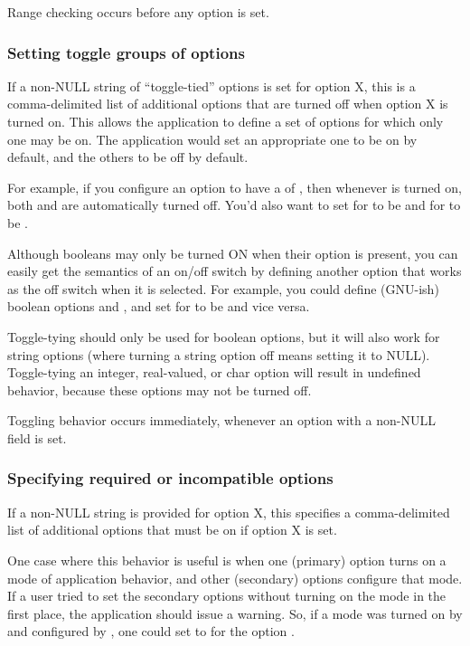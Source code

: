 Range checking occurs before any option is set.

   \subsubsection{Setting toggle groups of options}

If a non-NULL string  of ``toggle-tied'' options is
set for option X, this is a comma-delimited list of additional options
that are turned off when option X is turned on. This allows the
application to define a set of options for which only one may be
on. The application would set an appropriate one to be on by default,
and the others to be off by default.

For example, if you configure an option  to have a
 of , then whenever  is
turned on, both  and  are automatically turned
off. You'd also want to set  for  to be
 and  for  to be
.

Although booleans may only be turned ON when their option is present,
you can easily get the semantics of an on/off switch by defining
another option that works as the off switch when it is selected. For
example, you could define (GNU-ish) boolean options  and
, and set  for  to be
 and vice versa.  

Toggle-tying should only be used for boolean options, but it will also
work for string options (where turning a string option off means
setting it to NULL). Toggle-tying an integer, real-valued, or char
option will result in undefined behavior, because these options may
not be turned off.

Toggling behavior occurs immediately, whenever an option with a
non-NULL  field is set.

   \subsubsection{Specifying required or incompatible options}

If a non-NULL string  is provided for option X,
this specifies a comma-delimited list of additional options that must
be on if option X is set. 

One case where this behavior is useful is when one (primary) option
turns on a mode of application behavior, and other (secondary) options
configure that mode. If a user tried to set the secondary options
without turning on the mode in the first place, the application should
issue a warning. So, if a mode was turned on by  and
configured by , one could set
 to  for the option
.

